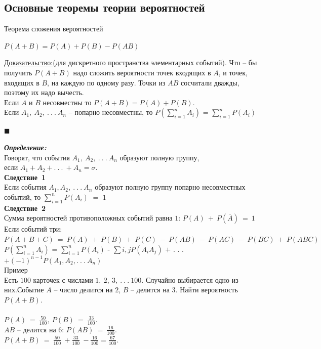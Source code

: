 \documentclass[russian, 12pt, fleqn]{article}
\begin{document}
\subsection{Основные теоремы теории вероятностей}
$\textbf{Теорема сложения вероятностей}$
\begin{tabbing}
\qquad\qquad$P(A + B) = P(A) + P(B)  -  P(AB)$
\end{tabbing}
\underline{Доказательство:}(для дискретного пространства элементарных событий). Что -- бы получить $P(A + B)$ надо сложить вероятности точек входящих в $A$, и точек, входящих в $B$, на каждую по одному разу. Точки из $AB$ сосчитали дважды, поэтому их надо вычесть.\\
Если $A$ и $B$ несовместны то $P(A+B)=P(A)+P(B)$.\\
Если $A_1,\ A_2,\ .\ .\ .\ A_n$ -- попарно несовместны, то $P(\sum\limits_{i=1}^{n}A_i)$ = $\sum\limits_{i=1}^{n}P(A_i)$
\begin{flushright}\(\blacksquare\)\end{flushright}
\textit{\textbf{Определение:}}\\ Говорят, что события $A_1, \ A_2,\ .\ .\ .\ A_n$ образуют полную группу, \\если $A_1+A_2+.\ .\ .\ +A_n=\sigma$.\\
\textbf{Следствие\ 1}\\ Если события $A_1,A_2,\ .\ .\ .\ A_n$ образуют полную группу попарно несовместных событий, то  $\sum\limits_{i=1}^{n}P(A_i)$ $=$ $1$\\
\textbf{Следствие\ 2} \\Сумма вероятностей противоположных событий равна $1$: $P(A)\ +\ P(\overline{A})\ =\ 1$\\
Если событий три:\\
$P(A+B+C)\  = \ P(A)\ +\ P(B)\ +\ P(C)\ -\ P(AB)\ -\  P(AC)\ -\ P(BC)\ +\ P(ABC)$\\
$P(\sum\limits_{i=1}^{n}A_i)$ = $\sum\limits_{i=1}^{n}P(A_i)$ - $\sum\limits{i,j}P(A_iA_j)$ $+$ . . . $+(-1)^{n-1}P(A_1,A_2, .\ .\ .\ A_n)$\\
$\textbf{Пример}$\\  Есть $100$ карточек с числами $1,\ 2,\ 3,\ .\ .\ .\ 100.$ Случайно выбирается одно из них.Событие $A$ -- число делится на $2$, $B$ -- делится на $3$. Найти вероятность $P(A+B)$.\\
\\
$P(A)\ =\ \frac{50}{100},\ P(B)\ =\ \frac{33}{100}$.\\  $AB$ -- делится на $6$: $P(AB)\ =\ \frac{16}{100}$. \\$P(A+B)\ =\ \frac{50}{100}\ + \frac{33}{100}\ -\frac{16}{100}=\frac{67}{100}$. \\\\
\end{document}
